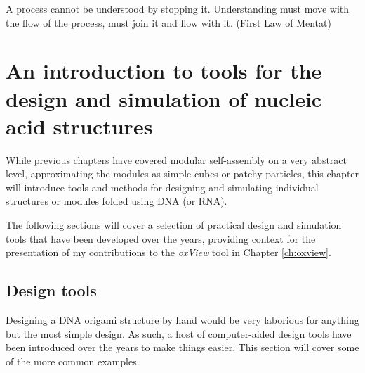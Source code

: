 \begin{savequote}[8cm]
A process cannot be understood by stopping it. Understanding must move with the flow of the process, must join it and flow with it. (First Law of Mentat)
\end{savequote}

\chapter{\label{ch:oxview_intro}An introduction to tools for the design and simulation of nucleic acid structures}

\minitoc

While previous chapters have covered modular self-assembly on a very abstract level, approximating the modules as simple cubes or patchy particles, this chapter will introduce tools and methods for designing and simulating individual structures or modules folded using DNA (or RNA).

The following sections will cover a selection of practical design and simulation tools that have been developed over the years, providing context for the presentation of my contributions to the \emph{oxView} tool in Chapter \ref{ch:oxview}.







\section{Design tools}\label{sec:design_tools}
Designing a DNA origami structure by hand would be very laborious for anything but the most simple design. As such, a host of computer-aided design tools have been introduced over the years to make things easier. This section will cover some of the more common examples.

